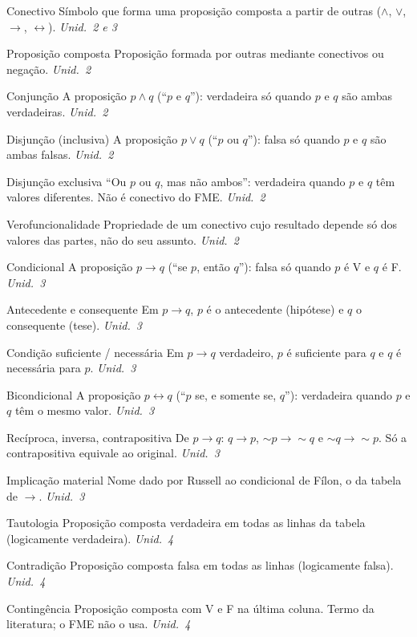 \begin{glossario}
\item[Conectivo] Símbolo que forma uma proposição composta a partir de outras ($\wedge$, $\vee$, $\rightarrow$, $\leftrightarrow$). \hfill\emph{Unid.~2 e 3}
\item[Proposição composta] Proposição formada por outras mediante conectivos ou negação. \hfill\emph{Unid.~2}
\item[Conjunção] A proposição $p\wedge q$ (\enquote{$p$ e $q$}): verdadeira só quando $p$ e $q$ são ambas verdadeiras. \hfill\emph{Unid.~2}
\item[Disjunção (inclusiva)] A proposição $p\vee q$ (\enquote{$p$ ou $q$}): falsa só quando $p$ e $q$ são ambas falsas. \hfill\emph{Unid.~2}
\item[Disjunção exclusiva] \enquote{Ou $p$ ou $q$, mas não ambos}: verdadeira quando $p$ e $q$ têm valores diferentes. Não é conectivo do FME. \hfill\emph{Unid.~2}
\item[Verofuncionalidade] Propriedade de um conectivo cujo resultado depende só dos valores das partes, não do seu assunto. \hfill\emph{Unid.~2}
\item[Condicional] A proposição $p\rightarrow q$ (\enquote{se $p$, então $q$}): falsa só quando $p$ é V e $q$ é F. \hfill\emph{Unid.~3}
\item[Antecedente e consequente] Em $p\rightarrow q$, $p$ é o antecedente (hipótese) e $q$ o consequente (tese). \hfill\emph{Unid.~3}
\item[Condição suficiente / necessária] Em $p\rightarrow q$ verdadeiro, $p$ é suficiente para $q$ e $q$ é necessária para $p$. \hfill\emph{Unid.~3}
\item[Bicondicional] A proposição $p\leftrightarrow q$ (\enquote{$p$ se, e somente se, $q$}): verdadeira quando $p$ e $q$ têm o mesmo valor. \hfill\emph{Unid.~3}
\item[Recíproca, inversa, contrapositiva] De $p\rightarrow q$: $q\rightarrow p$, ${\sim}p\rightarrow{\sim}q$ e ${\sim}q\rightarrow{\sim}p$. Só a contrapositiva equivale ao original. \hfill\emph{Unid.~3}
\item[Implicação material] Nome dado por Russell ao condicional de Fílon, o da tabela de $\rightarrow$. \hfill\emph{Unid.~3}
\item[Tautologia] Proposição composta verdadeira em todas as linhas da tabela (logicamente verdadeira). \hfill\emph{Unid.~4}
\item[Contradição] Proposição composta falsa em todas as linhas (logicamente falsa). \hfill\emph{Unid.~4}
\item[Contingência] Proposição composta com V e F na última coluna. Termo da literatura; o FME não o usa. \hfill\emph{Unid.~4}

\end{glossario}
